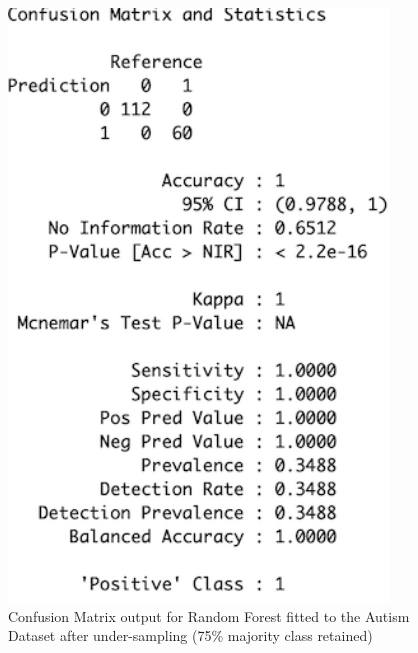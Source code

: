 \begin{figure}[!htbp]
    \centering
    \begin{minipage}{0.45\textwidth}
        \centering
        \includegraphics[width=0.9\textwidth]{ThesisTemplate/appendix/images/Chapter5Appendix/ConfusionMatrix75/Autism.png}
        \caption{Confusion Matrix output for Random Forest fitted to the Autism Dataset after under-sampling (75\% majority class retained)}
        \label{fig:my_label}
    \end{minipage}\hfill
    \begin{minipage}{0.45\textwidth}
        \centering

\end{minipage}
\end{figure}
